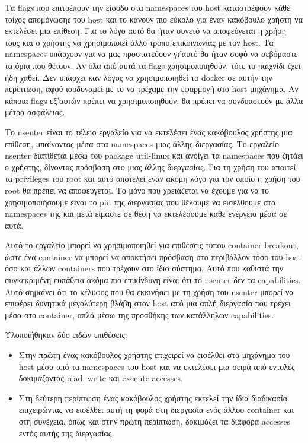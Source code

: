 \begin{description}[style=nextline]
Τα \en flags\gr{} που επιτρέπουν την είσοδο στα \en namespaces\gr{} του \en host\gr{} καταστρέφουν κάθε τοίχος απομόνωσης του \en host\gr{} και το κάνουν πιο εύκολο για έναν κακόβουλο χρήστη να εκτελέσει μια επίθεση. Για το λόγο αυτό θα ήταν συνετό να αποφεύγεται η χρήση τους και ο χρήστης να χρησιμοποιεί άλλο τρόπο επικοινωνίας με τον \en host\gr{}. Τα \en namespaces\gr{} υπάρχουν για να μας προστατεύουν γι'αυτό θα ήταν σοφό να σεβόμαστε τα όρια που θέτουν. Αν όλα από αυτά τα \en flags\gr{} χρησιμοποιηθούν, τότε το παιχνίδι έχει ήδη χαθεί. Δεν υπάρχει καν λόγος να χρησιμοποιηθεί το \en docker\gr{} σε αυτήν την περίπτωση, αφού ισοδυναμεί με το να τρέχαμε την εφαρμογή στο \en host\gr{} μηχάνημα. Αν κάποια \en flags\gr{} εξ'αυτών πρέπει να χρησιμοποιηθούν, θα πρέπει να συνδυαστούν με άλλα μέτρα ασφάλειας.

\item[Χρήση του εργαλείου \en nsenter\gr{}]
Το \en nsenter\gr{} είναι το τέλειο εργαλείο για να εκτελέσει ένας κακόβουλος χρήστης μια επίθεση, μπαίνοντας μέσα στα \en namespaces\gr{} μιας άλλης διεργασίας. Το εργαλείο \en nsenter\gr{} διατίθεται μέσω του \en package util-linux\gr{} και ανοίγει τα \en namespaces\gr{} που ζητάει ο χρήστης, δίνοντας πρόσβαση στο  μιας άλλης διεργασίας. Για τη χρήση του απαιτεί τα \en privileges\gr{} του \en root\gr{} και αυτό αποτελεί έναν ακόμη λόγο για τον οποίο η χρήση του \en root\gr{} θα πρέπει να αποφεύγεται. Το μόνο που χρειάζεται να έχουμε για να το χρησιμοποιήσουμε είναι το \en pid\gr{} της διεργασίας που θέλουμε να εισέλθουμε στα \en namespaces\gr{} της και μετά είμαστε σε θέση να εκτελέσουμε κάθε ενέργεια μέσα σε αυτά. 

Αυτό το εργαλείο μπορεί να χρησιμοποιηθεί για επιθέσεις τύπου \en container breakout\gr{}, ώστε ένα \en container\gr{} να μπορεί να αποκτήσει πρόσβαση στο περιβάλλον τόσο του \en host\gr{} όσο και άλλων \en containers\gr{} που τρέχουν στο ίδιο σύστημα. Αυτό που καθιστά την συγκεκριμένη ευπάθεια ακόμα πιο επικίνδυνη είναι ότι το \en nsenter\gr{} δεν  τα \en capabilities\gr{}. Αυτό σημαίνει ότι το κέλυφος που θα εκκινήσει με τη χρήση του \en nsenter\gr{} μπορεί να επιφέρει δυνητικά μεγαλύτερη βλάβη στον \en host\gr{} από μια απλή διεργασία που τρέχει μέσα στο \en container\gr{}, απλά μέσω της προσθήκης των κατάλληλων \en capabilities\gr{}.

Υλοποιήθηκαν δύο ειδών επιθέσεις:
\begin{itemize}
\item Στην πρώτη ένας κακόβουλος χρήστης επιχειρεί να εισέλθει στο μηχάνημα του \en host\gr{} μέσα από τα \en namespaces\gr{} του \en host\gr{} και να εκτελέσει μια σειρά από εντολές δοκιμάζοντας \en read, write\gr{} και \en execute accesses\gr{}.
\item Στη δεύτερη περίπτωση ένας κακόβουλος χρήστης εκτελεί την ίδια διαδικασία επιχειρώντας να εισέλθει αυτή τη φορά στη διεργασία ενός άλλου \en container\gr{} και στη συνέχεια, όπως και στην πρώτη περίπτωση, δοκιμάζει τα διάφορα \en accesses\gr{} εντός αυτής της διεργασίας.
\end{itemize}


\end{description}
